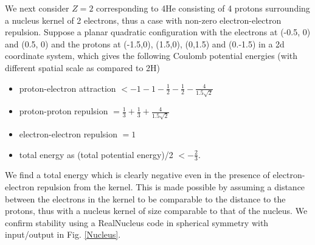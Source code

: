 \documentclass[11pt]{article} %
\begin{document}
We next consider $Z=2$ corresponding to 4He consisting of 4 protons surrounding a nucleus kernel of 2 electrons,  thus a case with non-zero electron-electron repulsion.  Suppose a planar quadratic configuration with the electrons at (-0.5, 0) and (0.5, 0) and the protons at (-1.5,0), (1.5,0), (0,1.5) and (0.-1.5) in a 2d coordinate system,  which gives the following Coulomb potential energies (with different spatial scale as compared to 2H)   
\begin{itemize}
\item proton-electron attraction $<-1-1-\frac{1}{2}-\frac{1}{2}-\frac{4}{1.5\sqrt{2}}$
\item proton-proton repulsion $=\frac{1}{3}+\frac{1}{3}+\frac{4}{1.5\sqrt{2}}$
\item electron-electron repulsion $=1$ 
\item total energy as (total potential energy)/2 $<-\frac{2}{3}$.  
\end{itemize}     
We find a total energy which is clearly negative even in the presence of electron-electron repulsion from the kernel.  This is made possible by assuming a distance between the electrons in the kernel to be comparable to the distance to the protons,  thus with a nucleus kernel of size comparable to that of the nucleus.  We confirm stability using a RealNucleus code in spherical symmetry \cite{Nucleus} with input/output in Fig. \ref{Nucleus}.






\end{document}
